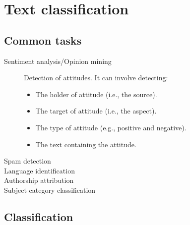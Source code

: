 \chapter{Text classification}


\section{Common tasks}

\begin{description}
    \item[Sentiment analysis/Opinion mining] 
        Detection of attitudes. It can involve detecting:
        \begin{itemize}
            \item The holder of attitude (i.e., the source).
            \item The target of attitude (i.e., the aspect).
            \item The type of attitude (e.g., positive and negative).
            \item The text containing the attitude. 
        \end{itemize}

    \item[Spam detection]
    \item[Language identification]
    \item[Authorship attribution]
    \item[Subject category classification] 
\end{description}


\section{Classification}

